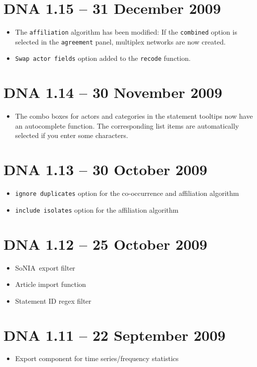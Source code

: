 \documentclass[12pt,a4paper]{scrreprt}
\newcommand{\sonia}{SoNIA}
\newcommand{\code}[1]{\texttt{#1}}
\begin{document}
\section*{DNA 1.15 -- 31 December 2009}
\begin{itemize}
 \item The \code{affiliation} algorithm has been modified: If the \code{combined} option is selected in the \code{agreement} panel, multiplex networks are now created.
 \item \code{Swap actor fields} option added to the \code{recode} function.
\end{itemize}

\section*{DNA 1.14 -- 30 November 2009}
\begin{itemize}
 \item The combo boxes for actors and categories in the statement tooltips now have an autocomplete function. The corresponding list items are automatically selected if you enter some characters.
\end{itemize}

\section*{DNA 1.13 -- 30 October 2009}
\begin{itemize}
 \item \code{ignore duplicates} option for the co-occurrence and affiliation algorithm
 \item \code{include isolates} option for the affiliation algorithm
\end{itemize}

\section*{DNA 1.12 -- 25 October 2009}
\begin{itemize}
 \item \sonia\ export filter
 \item Article import function
 \item Statement ID regex filter
\end{itemize}

\section*{DNA 1.11 -- 22 September 2009}
\begin{itemize}
 \item Export component for time series/frequency statistics
\end{itemize}
\end{document}
